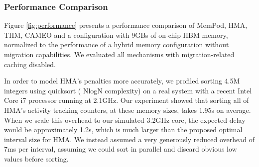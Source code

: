 \subsubsection{Performance Comparison}
\label{sub:performance}

Figure \ref{fig:performance} presents a performance comparison of MemPod, HMA, THM, CAMEO and a configuration with 9GBs of on-chip HBM memory, normalized to the performance of a hybrid memory configuration without migration capabilities. We evaluated all mechanisms with migration-related caching disabled. 

In order to model HMA's penalties more accurately, we profiled sorting 4.5M integers using quicksort ( NlogN complexity) on a real system with a recent Intel Core i7 processor running at 2.1GHz. Our experiment showed that sorting all of HMA's activity tracking counters, at these memory sizes, takes 1.95s on 
average. When we scale this overhead to our simulated 3.2GHz core, the expected delay would be approximately 1.2s, which is much larger than the proposed optimal interval size for HMA. We instead assumed a very generously reduced overhead of 7ms per interval, assuming we could sort in parallel and discard obvious low values before sorting.


